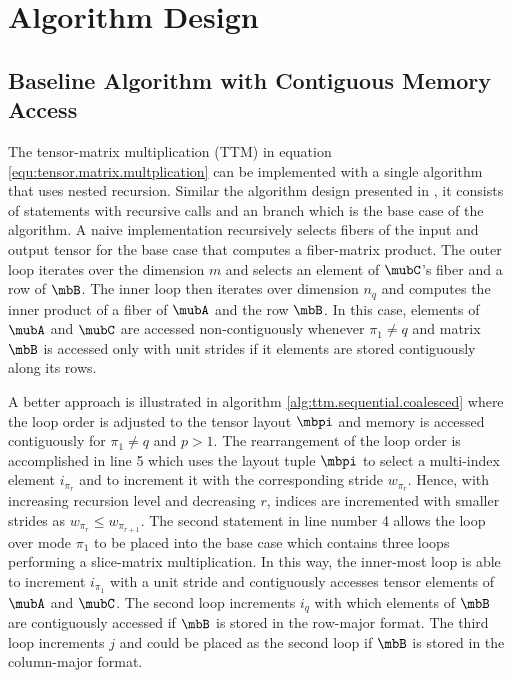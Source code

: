 \section{Algorithm Design}
\label{sec:design}
\subsection{Baseline Algorithm with Contiguous Memory Access}
\label{sec:design:modified.baseline.algorithm}
The tensor-matrix multiplication (TTM) in equation \ref{equ:tensor.matrix.multplication} can be implemented with a single algorithm that uses nested recursion.
Similar the algorithm design presented in \cite{bassoy:2018:fast}, it consists of  statements with recursive calls and an  branch which is the base case of the algorithm.
A naive implementation recursively selects fibers of the input and output tensor for the base case that computes a fiber-matrix product.
The outer loop iterates over the dimension $m$ and selects an element of $\mubC$'s fiber and a row of $\mbB$. 
The inner loop then iterates over dimension $n_q$ and computes the inner product of a fiber of $\mubA$ and the row $\mbB$. 
In this case, elements of $\mubA$ and $\mubC$ are accessed non-contiguously whenever $\pi_1 \neq q$ and matrix $\mbB$ is accessed only with unit strides 
if it elements are stored contiguously along its rows.

A better approach is illustrated in algorithm \ref{alg:ttm.sequential.coalesced} where the loop order is adjusted to the tensor layout $\mbpi$ and memory is accessed contiguously for $\pi_1 \neq q$ and $p > 1$.
The rearrangement of the loop order is accomplished in line 5 which uses the layout tuple $\mbpi$ to select a multi-index element $i_{\pi_r}$ and to increment it with the corresponding stride $w_{\pi_r}$.
Hence, with increasing recursion level and decreasing $r$, indices are incremented with smaller strides as $w_{\pi_r} \leq w_{\pi_{r+1}}$.
The second  statement in line number 4 allows the loop over mode $\pi_1$ to be placed into the base case which contains three loops performing a slice-matrix multiplication.
In this way, the inner-most loop is able to increment $i_{\pi_1}$ with a unit stride and contiguously accesses tensor elements of $\mubA$ and $\mubC$.
The second loop increments $i_q$ with which elements of $\mbB$ are contiguously accessed if $\mbB$ is stored in the row-major format.
The third loop increments $j$ and could be placed as the second loop if $\mbB$ is stored in the column-major format.

